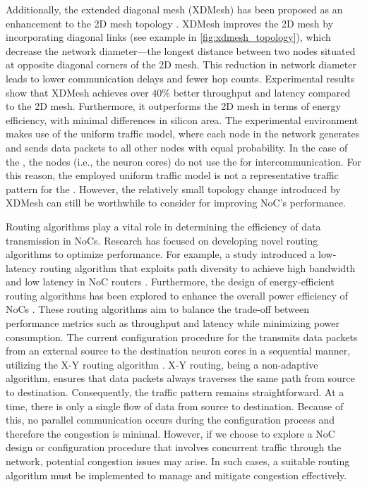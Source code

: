 Additionally, the extended diagonal mesh (XDMesh) has been proposed as an enhancement to the 2D mesh topology \cite{furhadExtendedDiagonalMesh2015}.
XDMesh improves the 2D mesh by incorporating diagonal links (see example in \cref{fig:xdmesh_topology}), which decrease the network diameter---the longest distance between two nodes situated at opposite diagonal corners of the 2D mesh.
This reduction in network diameter leads to lower communication delays and fewer  hop counts.
Experimental results show that XDMesh achieves over $40\%$ better throughput and latency compared to the 2D mesh.
Furthermore, it outperforms the 2D mesh in terms of energy efficiency, with minimal differences in silicon area.
The experimental environment makes use of the uniform traffic model, where each node in the network generates and sends data packets to all other nodes with equal probability.
In the case of the \graicore{}, the nodes (i.e., the neuron cores) do not use the \confignoc{} for intercommunication.
For this reason, the employed uniform traffic model is not a representative traffic pattern for the \confignoc{}. 
However, the relatively small topology change introduced by XDMesh can still be worthwhile to consider for improving NoC's performance.

Routing algorithms play a vital role in determining the efficiency of data transmission in NoCs.
Research has focused on developing novel routing algorithms to optimize performance.
For example, a study introduced a low-latency routing algorithm that exploits path diversity to achieve high bandwidth and low latency in NoC routers \cite{yangExploitingPathDiversity2012}.
Furthermore, the design of energy-efficient routing algorithms has been explored to enhance the overall power efficiency of NoCs \cite{parikhPowerAwareNoCsRouting2014}.
These routing algorithms aim to balance the trade-off between performance metrics such as throughput and latency while minimizing power consumption.
The current configuration procedure for the \graicore{} transmits data packets from an external source to the destination neuron cores in a sequential manner, utilizing the X-Y routing algorithm \cite{glassTurnModelAdaptive1992}.
X-Y routing, being a non-adaptive algorithm, ensures that data packets always traverses the same path from source to destination.
Consequently, the traffic pattern remains straightforward.
At a time, there is only a single flow of data from source to destination.
Because of this, no parallel communication occurs during the configuration process and therefore the congestion is minimal.
However, if we choose to explore a NoC design or configuration procedure that involves concurrent traffic through the network, potential congestion issues may arise.
In such cases, a suitable routing algorithm must be implemented to manage and mitigate congestion effectively.

